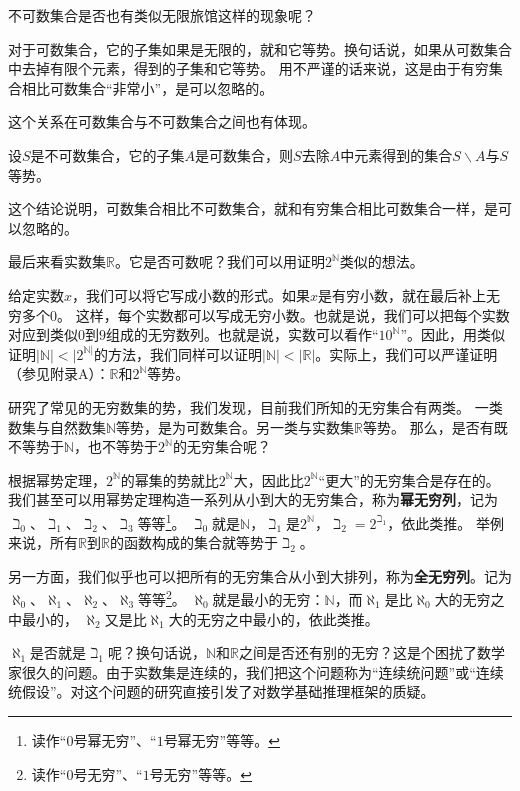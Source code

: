 \documentclass[12pt,UTF8]{ctexbook}
\begin{document}
不可数集合是否也有类似无限旅馆这样的现象呢？

对于可数集合，它的子集如果是无限的，就和它等势。换句话说，如果从可数集合中去掉有限个元素，得到的子集和它等势。
用不严谨的话来说，这是由于有穷集合相比可数集合“非常小”，是可以忽略的。

这个关系在可数集合与不可数集合之间也有体现。
\begin{tm}
    设$S$是不可数集合，它的子集$A$是可数集合，则$S$去除$A$中元素得到的集合$S\backslash A$与$S$等势。
\end{tm}

这个结论说明，可数集合相比不可数集合，就和有穷集合相比可数集合一样，是可以忽略的。

最后来看实数集$\mathbb{R}$。它是否可数呢？我们可以用证明$2^\mathbb{N}$类似的想法。

给定实数$x$，我们可以将它写成小数的形式。如果$x$是有穷小数，就在最后补上无穷多个$0$。
这样，每个实数都可以写成无穷小数。也就是说，我们可以把每个实数对应到类似$0$到$9$组成的无穷数列。也就是说，实数可以看作“$10^{\mathbb{N}}$”。因此，用类似证明$|\mathbb{N}|<|2^{\mathbb{N}|}$的方法，我们同样可以证明$|\mathbb{N}|<|\mathbb{R}|$。实际上，我们可以严谨证明（参见附录A）：$\mathbb{R}$和$2^\mathbb{N}$等势。

研究了常见的无穷数集的势，我们发现，目前我们所知的无穷集合有两类。
一类数集与自然数集$\mathbb{N}$等势，是为可数集合。另一类与实数集$\mathbb{R}$等势。
那么，是否有既不等势于$\mathbb{N}$，也不等势于$2^\mathbb{N}$的无穷集合呢？

根据幂势定理，$2^\mathbb{N}$的幂集的势就比$2^\mathbb{N}$大，因此比$2^\mathbb{N}$“更大”的无穷集合是存在的。
我们甚至可以用幂势定理构造一系列从小到大的无穷集合，称为\textbf{幂无穷列}，记为$\beth_0$、$\beth_1$、$\beth_2$、$\beth_3$等等\footnote{读作“$0$号幂无穷”、“$1$号幂无穷”等等。}。
$\beth_0$就是$\mathbb{N}$，$\beth_1$是$2^\mathbb{N}$，$\beth_2 = 2^{\beth_1}$，依此类推。
举例来说，所有$\mathbb{R}$到$\mathbb{R}$的函数构成的集合就等势于$\beth_2$。

另一方面，我们似乎也可以把所有的无穷集合从小到大排列，称为\textbf{全无穷列}。记为$\aleph_0$、$\aleph_1$、$\aleph_2$、$\aleph_3$等等\footnote{读作“$0$号无穷”、“$1$号无穷”等等。}。
$\aleph_0$就是最小的无穷：$\mathbb{N}$，而$\aleph_1$是比$\aleph_0$大的无穷之中最小的，
$\aleph_2$又是比$\aleph_1$大的无穷之中最小的，依此类推。

$\aleph_1$是否就是$\beth_1$呢？换句话说，$\mathbb{N}$和$\mathbb{R}$之间是否还有别的无穷？这是个困扰了数学家很久的问题。由于实数集是连续的，我们把这个问题称为“连续统问题”或“连续统假设”。对这个问题的研究直接引发了对数学基础推理框架的质疑。
\end{document}
